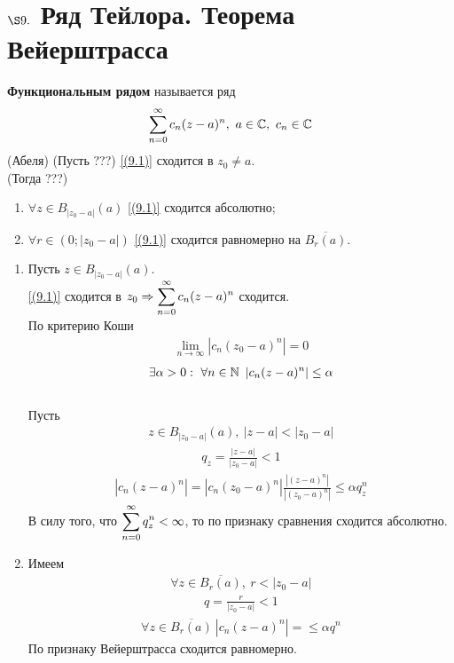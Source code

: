 \section{$\S 9.$ Ряд Тейлора. Теорема Вейерштрасса}
\Def
\textbf{Функциональным рядом} называется ряд
\begin{equation} \label{(9.1)}
    \sum_{n=0}^{\infty}c_n(z-a)^n, \ a \in \mathbb{C}, \ c_n \in \mathbb{C}
\end{equation}
\theorem (Абеля)
(Пусть ???) \eqref{(9.1)} сходится в $z_0 \neq a$.
\\
(Тогда ???)
\begin{enumerate}
    \item $\forall z \in B_{\left| z_0 - a \right|}(a)$ \eqref{(9.1)}
    сходится абсолютно;
    \item $\forall r \in (0; \left| z_0-a \right|)$ \eqref{(9.1)} сходится
    равномерно на $\overline{B_r(a)}$.
\end{enumerate}
\pr
\begin{enumerate}
    \item Пусть $z \in B_{\left| z_0-a \right|}(a)$.
    \\
    \eqref{(9.1)} сходится в $z_0 \Rightarrow \displaystyle
    \sum_{n=0}^{\infty}c_n(z-a)^n$ сходится.
    \\
    По критерию Коши
    \begin{align*}
      \lim_{n \to \infty}\left| c_n(z_0-a)^n \right| = 0
    \end{align*}
    \begin{align*}
      \exists \alpha > 0: \ \forall n \in \mathbb{N} \ \left| c_n(z-a)^n \right| \leq \alpha
    \end{align*}
    \\
    Пусть
    \begin{align*}
      z \in B_{\left| z_0-a \right|}(a), \ \left| z-a \right|< \left| z_0-a \right|
    \end{align*}
    \begin{align*}
      q_z = \frac{\left| z-a \right|}{\left| z_0-a \right|} < 1
    \end{align*}
    \begin{align*}
      \left| c_n(z-a)^n \right| = \left| c_n(z_0-a)^n \right|\frac{\left| (z-a)^n \right|}{\left| (z_0-a)^n \right|} \leq \alpha q_z^n
    \end{align*}
    В силу того, что $\displaystyle \sum_{n=0}^{\infty}q_{z}^{n} < \infty$, то по
    признаку сравнения сходится абсолютно.
    \item Имеем
    \begin{align*}
      \forall z \in \overline{B_{r}(a)}, \ r < \left| z_0-a \right|
    \end{align*}
    \begin{align*}
      q = \frac{r}{\left| z_0-a \right|} < 1
    \end{align*}
    \begin{align*}
      \forall z \in \overline{B_r(a)} \ \left| c_n(z-a)^n \right| = \leq \alpha q^n
    \end{align*}
    По признаку Вейерштрасса сходится равномерно.
\end{enumerate}
